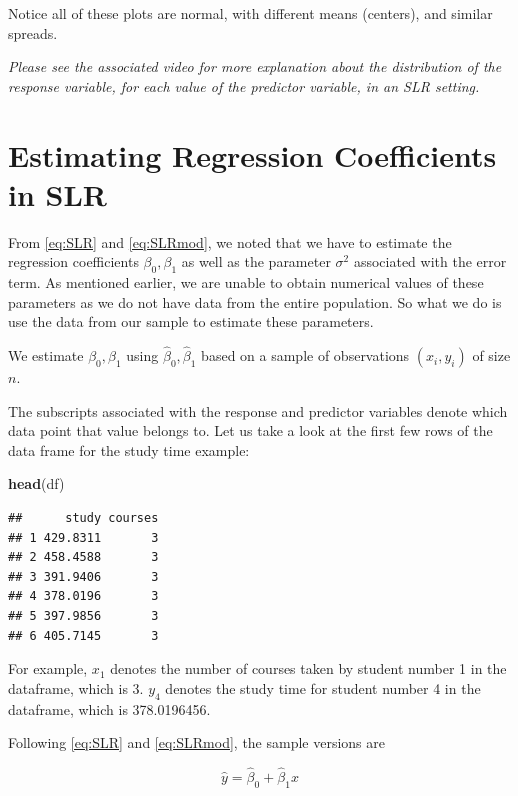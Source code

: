 \documentclass[
]{book}
\newenvironment{Shaded}{\begin{snugshade}}{\end{snugshade}}
\newcommand{\FunctionTok}[1]{\textcolor[rgb]{0.13,0.29,0.53}{\textbf{#1}}}
\newcommand{\NormalTok}[1]{#1}
\begin{document}
Notice all of these plots are normal, with different means (centers), and similar spreads.

\emph{Please see the associated video for more explanation about the distribution of the response variable, for each value of the predictor variable, in an SLR setting.}

\hypertarget{estimating-regression-coefficients-in-slr}{%
\section{Estimating Regression Coefficients in SLR}\label{estimating-regression-coefficients-in-slr}}

From \eqref{eq:SLR} and \eqref{eq:SLRmod}, we noted that we have to estimate the regression coefficients \(\beta_0, \beta_1\) as well as the parameter \(\sigma^2\) associated with the error term. As mentioned earlier, we are unable to obtain numerical values of these parameters as we do not have data from the entire population. So what we do is use the data from our sample to estimate these parameters.

We estimate \(\beta_0,\beta_1\) using \(\hat{\beta}_0,\hat{\beta}_1\) based on a sample of observations \((x_i,y_i)\) of size \(n\).

The subscripts associated with the response and predictor variables denote which data point that value belongs to. Let us take a look at the first few rows of the data frame for the study time example:

\begin{Shaded}
\begin{Highlighting}[]
\FunctionTok{head}\NormalTok{(df)}
\end{Highlighting}
\end{Shaded}

\begin{verbatim}
##      study courses
## 1 429.8311       3
## 2 458.4588       3
## 3 391.9406       3
## 4 378.0196       3
## 5 397.9856       3
## 6 405.7145       3
\end{verbatim}

For example, \(x_1\) denotes the number of courses taken by student number 1 in the dataframe, which is 3. \(y_4\) denotes the study time for student number 4 in the dataframe, which is 378.0196456.

Following \eqref{eq:SLR} and \eqref{eq:SLRmod}, the sample versions are

\begin{equation} 
\hat{y}=\hat{\beta}_0+\hat{\beta}_1 x
\label{eq:fitted}
\end{equation}
\end{document}
